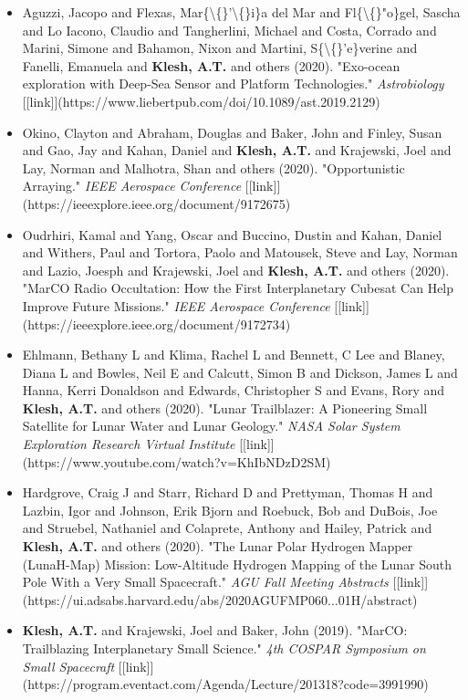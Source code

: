 \documentclass[11pt,letterpaper]{article}
\begin{document}
\begin{itemize}
\item Aguzzi, Jacopo and Flexas, Mar\{\textbackslash\{\}'\textbackslash\{\}i\}a del Mar and Fl\{\textbackslash\{\}"o\}gel, Sascha and Lo Iacono, Claudio and Tangherlini, Michael and Costa, Corrado and Marini, Simone and Bahamon, Nixon and Martini, S\{\textbackslash\{\}'e\}verine and Fanelli, Emanuela and \textbf{Klesh, A.T.} and others (2020). "Exo-ocean exploration with Deep-Sea Sensor and Platform Technologies." \textit{Astrobiology} [[link]](https://www.liebertpub.com/doi/10.1089/ast.2019.2129)
\item Okino, Clayton and Abraham, Douglas and Baker, John and Finley, Susan and Gao, Jay and Kahan, Daniel and \textbf{Klesh, A.T.} and Krajewski, Joel and Lay, Norman and Malhotra, Shan and others (2020). "Opportunistic Arraying." \textit{IEEE Aerospace Conference} [[link]](https://ieeexplore.ieee.org/document/9172675)
\item Oudrhiri, Kamal and Yang, Oscar and Buccino, Dustin and Kahan, Daniel and Withers, Paul and Tortora, Paolo and Matousek, Steve and Lay, Norman and Lazio, Joesph and Krajewski, Joel and \textbf{Klesh, A.T.} and others (2020). "MarCO Radio Occultation: How the First Interplanetary Cubesat Can Help Improve Future Missions." \textit{IEEE Aerospace Conference} [[link]](https://ieeexplore.ieee.org/document/9172734)
\item Ehlmann, Bethany L and Klima, Rachel L and Bennett, C Lee and Blaney, Diana L and Bowles, Neil E and Calcutt, Simon B and Dickson, James L and Hanna, Kerri Donaldson and Edwards, Christopher S and Evans, Rory and \textbf{Klesh, A.T.} and others (2020). "Lunar Trailblazer: A Pioneering Small Satellite for Lunar Water and Lunar Geology." \textit{NASA Solar System Exploration Research Virtual Institute} [[link]](https://www.youtube.com/watch?v=KhIbNDzD2SM)
\item Hardgrove, Craig J and Starr, Richard D and Prettyman, Thomas H and Lazbin, Igor and Johnson, Erik Bjorn and Roebuck, Bob and DuBois, Joe and Struebel, Nathaniel and Colaprete, Anthony and Hailey, Patrick and \textbf{Klesh, A.T.} and others (2020). "The Lunar Polar Hydrogen Mapper (LunaH-Map) Mission: Low-Altitude Hydrogen Mapping of the Lunar South Pole With a Very Small Spacecraft." \textit{AGU Fall Meeting Abstracts} [[link]](https://ui.adsabs.harvard.edu/abs/2020AGUFMP060...01H/abstract)
\item \textbf{Klesh, A.T.} and Krajewski, Joel and Baker, John (2019). "MarCO: Trailblazing Interplanetary Small Science." \textit{4th COSPAR Symposium on Small Spacecraft} [[link]](https://program.eventact.com/Agenda/Lecture/201318?code=3991990)

\end{itemize}
\end{document}

